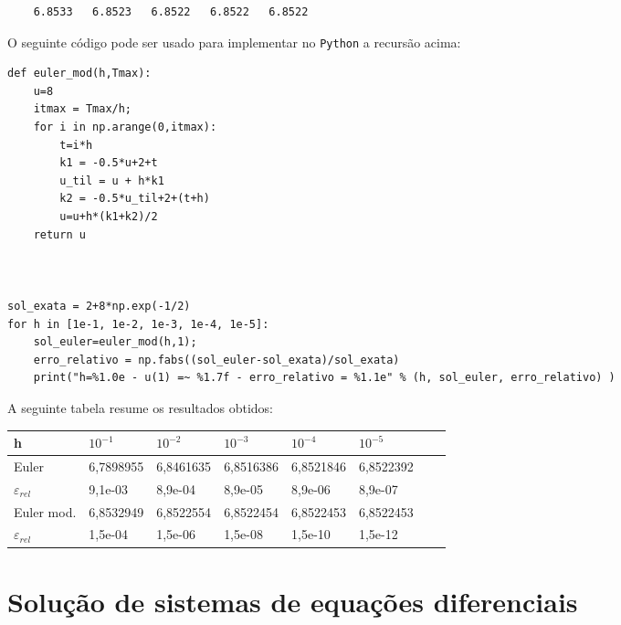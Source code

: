 \begin{resol}
\begin{verbatim}
    6.8533   6.8523   6.8522   6.8522   6.8522
\end{verbatim}
\fi










\ifispython
O seguinte código pode ser usado para implementar no \verb+Python+ a recursão acima:

\begin{verbatim}
def euler_mod(h,Tmax):
	u=8
  	itmax = Tmax/h;
	for i in np.arange(0,itmax):
		t=i*h
		k1 = -0.5*u+2+t
		u_til = u + h*k1
		k2 = -0.5*u_til+2+(t+h)
		u=u+h*(k1+k2)/2
	return u

	

sol_exata = 2+8*np.exp(-1/2)
for h in [1e-1, 1e-2, 1e-3, 1e-4, 1e-5]:
	sol_euler=euler_mod(h,1);
	erro_relativo = np.fabs((sol_euler-sol_exata)/sol_exata)
	print("h=%1.0e - u(1) =~ %1.7f - erro_relativo = %1.1e" % (h, sol_euler, erro_relativo) )

\end{verbatim}
\fi
A seguinte tabela resume os resultados obtidos:
\begin{center}
 \begin{tabular}{|l|l|l|l|l|l|l|l|}%
\hline
   h&$10^{-1}$&$10^{-2}$&$10^{-3}$&$10^{-4}$&$10^{-5}$\\
   \hline
   Euler & 6,7898955 &  6,8461635  &  6,8516386  &  6,8521846  &  6,8522392  \\
   \hline
   $\varepsilon_{rel}$ &9,1e-03 &  8,9e-04  & 8,9e-05&   8,9e-06 &  8,9e-07\\
   \hline
  Euler mod. & 6,8532949 &  6,8522554  &  6,8522454  &  6,8522453  &  6,8522453 \\
   \hline
   $\varepsilon_{rel}$ &1,5e-04 &  1,5e-06  & 1,5e-08&   1,5e-10 &  1,5e-12\\
   \hline
 
   \end{tabular}
\end{center}
\end{resol}

\section{Solução de sistemas de equações diferenciais}\label{pvi:solsistema}

